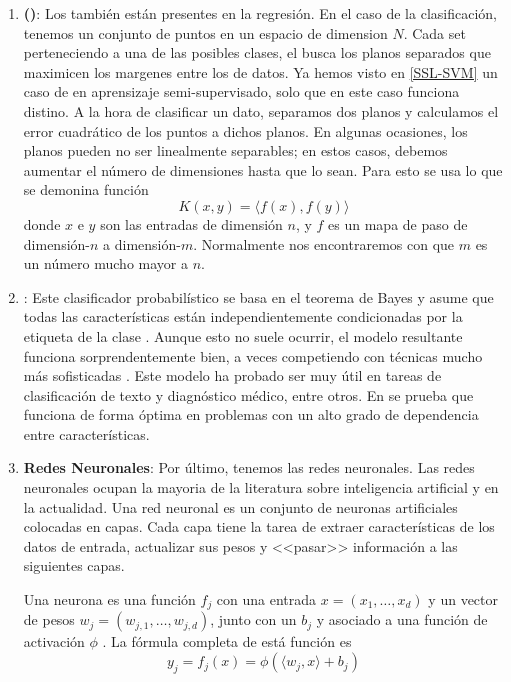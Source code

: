 \begin{enumerate}
  \item \textbf{ ()}: Los  también están presentes en la regresión. En el caso de la clasificación, tenemos un conjunto de puntos en un espacio de dimension $N$. Cada set perteneciendo a una de las posibles clases, el  busca los planos separados que maximicen los margenes entre los  de datos. Ya hemos visto en \ref{SSL-SVM} un caso de  en aprensizaje semi-supervisado, solo que en este caso funciona distino. A la hora de clasificar un dato, separamos dos planos y calculamos el error cuadrático de los puntos a dichos planos. En algunas ocasiones, los planos pueden no ser linealmente separables; en estos casos, debemos aumentar el número de dimensiones hasta que lo sean. Para esto se usa lo que se demonina función   \[K(x,y)=\langle f(x), f(y) \rangle \] donde $x$ e $y$ son las entradas de dimensión $n$, y $f$ es un mapa de paso de dimensión-$n$ a dimensión-$m$. Normalmente nos encontraremos con que $m$ es un número mucho mayor a $n$.

  \item \textbf{}: Este clasificador probabilístico se basa en el teorema de Bayes y asume que todas las características están independientemente condicionadas por la etiqueta de la clase . Aunque esto no suele ocurrir, el modelo resultante funciona sorprendentemente bien, a veces competiendo con técnicas mucho más sofisticadas . Este modelo ha probado ser muy útil en tareas de clasificación de texto y diagnóstico médico, entre otros. En  se prueba que  funciona de forma óptima en problemas con un alto grado de dependencia entre características.

  \item \textbf{Redes Neuronales}: Por último, tenemos las redes neuronales. Las redes neuronales ocupan la mayoria de la literatura sobre inteligencia artificial y  en la actualidad. Una red neuronal es un conjunto de neuronas artificiales colocadas en capas. Cada capa tiene la tarea de extraer características de los datos de entrada, actualizar sus pesos y <<pasar>> información a las siguientes capas.

        Una neurona es una función $f_j$ con una entrada $x = (x_1, \ldots , x_d)$ y un vector de pesos $w_j = (w_{j,1}, \ldots , w_{j,d})$, junto con un  $b_j$ y asociado a una función de activación $\phi$ . La fórmula completa de está función es \[y_j = f_j(x) = \phi (\langle w_j, x \rangle + b_j )\]


\end{enumerate}

